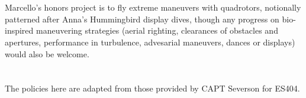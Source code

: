 \documentclass[10pt,courier]{navymemo}
\begin{document}
\section{} Marcello's honors project is to fly extreme maneuvers with quadrotors, notionally patterned after Anna's Hummingbird display dives, though any progress on bio-inspired maneuvering strategies (aerial righting, clearances of obstacles and apertures, performance in turbulence, advesarial maneuvers, dances or displays) would also be welcome. 

\section{}  The policies here are adapted from those provided by CAPT Severson for ES404.  
\end{document}
